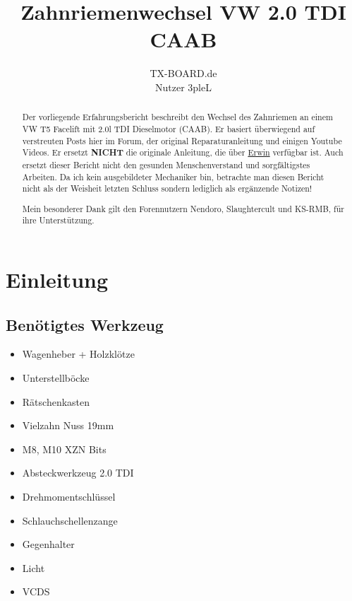 \documentclass[twoside,a4paper]{refart}
\title{Zahnriemenwechsel VW 2.0 TDI CAAB}
\author{TX-BOARD.de \\Nutzer 3pleL \\}
\date{}
\begin{document}
\maketitle

\begin{abstract}
	Der vorliegende Erfahrungsbericht beschreibt den Wechsel des Zahnriemen an einem VW T5 Facelift mit 2.0l TDI Dieselmotor (CAAB). Er basiert überwiegend auf verstreuten Posts hier im Forum, der original Reparaturanleitung und einigen Youtube Videos. Er ersetzt \textbf{NICHT} die originale Anleitung, die über \href{https://erwin.volkswagen.de/erwin/showHome.do}{Erwin} verfügbar ist. Auch ersetzt dieser Bericht nicht den gesunden Menschenverstand und sorgfältigstes Arbeiten. 
	Da ich kein ausgebildeter Mechaniker bin, betrachte man diesen Bericht nicht als der Weisheit letzten Schluss sondern lediglich als ergänzende Notizen!
	
	Mein besonderer Dank gilt den Forennutzern Nendoro, Slaughtercult und KS-RMB, für ihre Unterstützung. 
\end{abstract}

\tableofcontents

\newpage



\section{Einleitung}

\subsection{Benötigtes Werkzeug}
\begin{itemize}
	\item Wagenheber + Holzklötze
	\item Unterstellböcke
	\item Rätschenkasten 
	\item Vielzahn Nuss 19mm 
	\item M8, M10 XZN Bits
	\item Absteckwerkzeug 2.0 TDI 
	\item Drehmomentschlüssel
	\item Schlauchschellenzange
	\item Gegenhalter
	\item Licht
	\item VCDS
\end{itemize}
\end{document}
